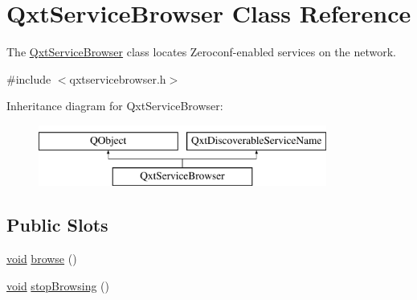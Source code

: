 \hypertarget{class_qxt_service_browser}{\section{Qxt\-Service\-Browser Class Reference}
\label{class_qxt_service_browser}
}


The \hyperlink{class_qxt_service_browser}{Qxt\-Service\-Browser} class locates Zeroconf-\/enabled services on the network.  




{\ttfamily \#include $<$qxtservicebrowser.\-h$>$}

Inheritance diagram for Qxt\-Service\-Browser\-:\begin{figure}[H]
\begin{center}
\leavevmode
\includegraphics[height=2.000000cm]{class_qxt_service_browser}
\end{center}
\end{figure}
\subsection*{Public Slots}
\begin{DoxyCompactItemize}
\item 
\hyperlink{group___u_a_v_objects_plugin_ga444cf2ff3f0ecbe028adce838d373f5c}{void} \hyperlink{class_qxt_service_browser_a2881a842a417ef17395733b4e01569a4}{browse} ()
\item 
\hyperlink{group___u_a_v_objects_plugin_ga444cf2ff3f0ecbe028adce838d373f5c}{void} \hyperlink{class_qxt_service_browser_ae55abbd2db7ba3f151049b1a6e587326}{stop\-Browsing} ()
\end{DoxyCompactItemize}
